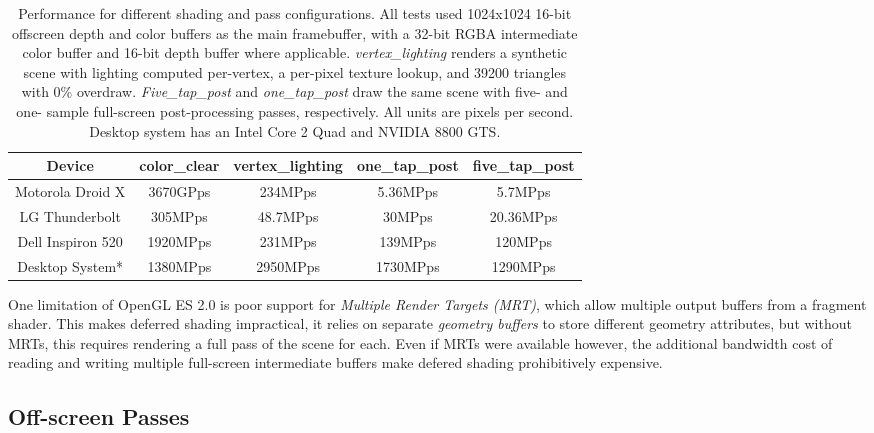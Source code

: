 \begin{table}[htb]\centering \begin{tabular}{|c||c|c|c|c|} 
\hline \small{Device} & \small{color\_clear} & \small{vertex\_lighting} & \small{one\_tap\_post} & \small{five\_tap\_post}  \\ \hline 
\hline \small{Motorola Droid X} & \small{3670GPps} & \small{234MPps}& \small{5.36MPps\footnotemark[1]} & \small{5.7MPps\footnotemark[1]} \\ 
\hline \small{LG Thunderbolt} & \small{305MPps} & \small{48.7MPps}& \small{30MPps} & \small{20.36MPps} \\ 
\hline \small{Dell Inspiron 520} & \small{1920MPps} & \small{231MPps}& \small{139MPps} & \small{120MPps} \\ 
\hline \small{Desktop System*} & \small{1380MPps} & \small{2950MPps}& \small{1730MPps} & \small{1290MPps} \\ 
\hline
\end{tabular} 
\caption{Performance for different shading and pass configurations.  All tests used 1024x1024 16-bit offscreen depth and color buffers as the main framebuffer, with a 32-bit RGBA intermediate color buffer and 16-bit depth buffer where applicable.  \textit{vertex\_lighting} renders a synthetic scene with lighting computed per-vertex, a per-pixel texture lookup, and 39200 triangles with 0\% overdraw.  \textit{Five\_tap\_post} and \textit{one\_tap\_post} draw the same scene with five- and one- sample full-screen post-processing passes, respectively.  All units are pixels per second.  Desktop system has an Intel Core 2 Quad and NVIDIA 8800 GTS.}
\label{JonMcCaffrey:pass_performance} \end{table}


One limitation of OpenGL ES 2.0 is poor support for \textit{Multiple Render
Targets (MRT)}, which allow multiple output buffers from a fragment shader.
This makes deferred shading impractical, it relies on separate \textit{geometry
buffers} to store different geometry attributes, but without MRTs, this
requires rendering a full pass of the scene for each.  Even if MRTs
were available however, the additional bandwidth cost of reading and writing
multiple full-screen intermediate buffers make defered shading prohibitively expensive.

\subsection{Off-screen Passes}
\label{Jon-McCaffrey-Off-Screen-Pass}

